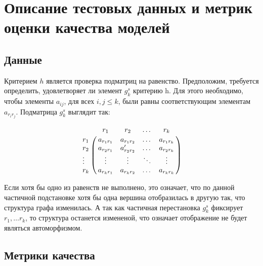 \section{Описание тестовых данных и метрик оценки качества моделей}
\label{sec:Chapter_3} 
\large


\subsection{Данные}

Критерием $h$ является проверка подматриц на равенство. Предположим, требуется определить, удовлетворяет ли элемент $g^s_k$ критерию h. Для этого необходимо, чтобы элементы $a_{ij}$, для всех $i,j \leq k$, были равны соответствующим элементам $a_{r_ir_j}$. Подматрица $g^s_k$ выглядит так:

\[ \bordermatrix{
& r_1 & r_2 & \dots & r_k \cr
r_1 & a_{r_1r_1} & a_{r_1r_2} & \dots & a_{r_1r_k} \cr
r_2 & a_{r_2r_1} & a'_{r_2r_2} & \dots & a_{r_2r_k} \cr
\vdots & \vdots & \vdots & \ddots & \vdots \cr
r_k & a_{r_kr_1} & a_{r_kr_2} & \dots & a_{r_kr_k} \cr}
\]

Если хотя бы одно из равенств не выполнено, это означает, что по данной частичной подстановке хотя бы одна вершина отобразилась в другую так, что структура графа изменилась. А так как частичная перестановка $g^s_k$ фиксирует $r_1, \ldots r_k$, то структура останется измененой, что означает отображение не будет являться автоморфизмом.



\subsection{Метрики качества}
